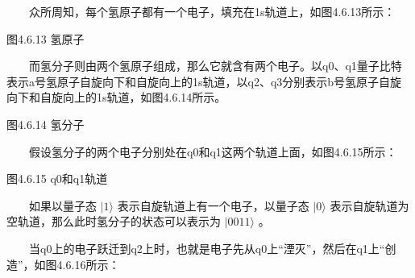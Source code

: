 \documentclass[a4paper,11pt,english]{sphinxmanual}
\begin{document}
\sphinxAtStartPar
{}

\sphinxAtStartPar
  众所周知，每个氢原子都有一个电子，填充在1s轨道上，如图4.6.13所示：


\begin{center}图4.6.13 氢原子
\end{center}
\sphinxAtStartPar
  而氢分子则由两个氢原子组成，那么它就含有两个电子。以q0、q1量子比特表示a号氢原子自旋向下和自旋向上的1s轨道，以q2、q3分别表示b号氢原子自旋向下和自旋向上的1s轨道，如图4.6.14所示。


\begin{center}图4.6.14 氢分子
\end{center}
\sphinxAtStartPar
  假设氢分子的两个电子分别处在q0和q1这两个轨道上面，如图4.6.15所示：


\begin{center}图4.6.15 q0和q1轨道
\end{center}
\sphinxAtStartPar
  如果以量子态  \(|1 \rangle\) 表示自旋轨道上有一个电子，以量子态  \(|0 \rangle\) 表示自旋轨道为空轨道，那么此时氢分子的状态可以表示为  \(|0011 \rangle\) 。

\sphinxAtStartPar
  当q0上的电子跃迁到q2上时，也就是电子先从q0上“湮灭”，然后在q1上“创造”，如图4.6.16所示：

\end{document}
